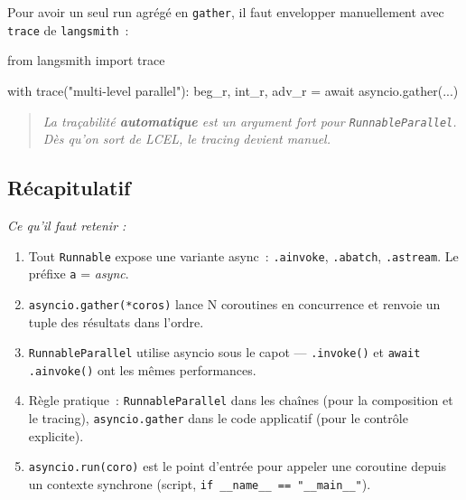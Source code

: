 \documentclass[11pt,a4paper]{article}
\begin{document}
Pour avoir un seul run agrégé en \texttt{gather}, il faut envelopper
manuellement avec \texttt{trace} de \texttt{langsmith}~:

\begin{pythoncode}
from langsmith import trace

with trace("multi-level parallel"):
    beg_r, int_r, adv_r = await asyncio.gather(...)
\end{pythoncode}

\begin{quote}\itshape
La traçabilité \textbf{automatique} est un argument fort pour
\texttt{RunnableParallel}. Dès qu'on sort de LCEL, le tracing devient
manuel.
\end{quote}

\subsection*{Récapitulatif}
{\itshape\sloppy
\textit{Ce qu'il faut retenir :}
\begin{enumerate}[leftmargin=*]
  \item Tout \texttt{Runnable} expose une variante async~:
        \texttt{.ainvoke}, \texttt{.abatch}, \texttt{.astream}. Le préfixe
        \texttt{a} = \emph{async}.
  \item \texttt{asyncio.gather(*coros)} lance N coroutines en concurrence
        et renvoie un tuple des résultats dans l'ordre.
  \item \texttt{RunnableParallel} utilise asyncio sous le capot —
        \texttt{.invoke()} et \texttt{await .ainvoke()} ont les mêmes
        performances.
  \item Règle pratique~: \texttt{RunnableParallel} dans les chaînes (pour
        la composition et le tracing), \texttt{asyncio.gather} dans le
        code applicatif (pour le contrôle explicite).
  \item \texttt{asyncio.run(coro)} est le point d'entrée pour appeler une
        coroutine depuis un contexte synchrone (script, \texttt{if
        \_\_name\_\_ == "\_\_main\_\_"}).
\end{enumerate}
\par}
\end{document}
